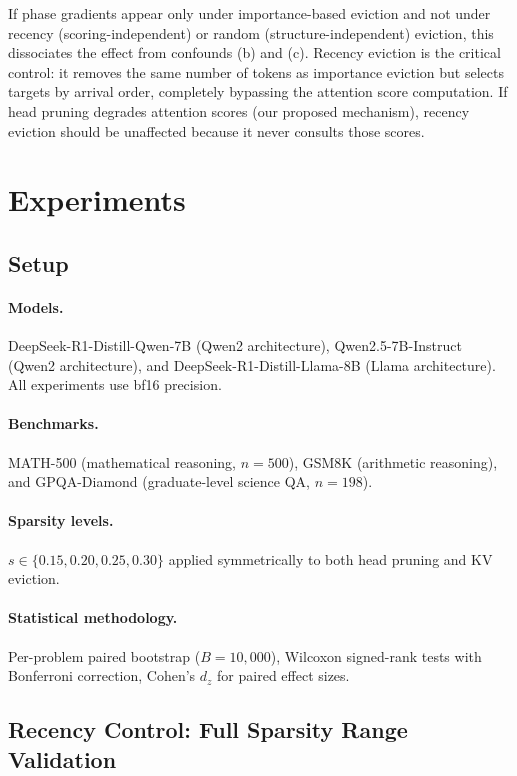 \documentclass[11pt,a4paper]{article}
\begin{document}
If phase gradients appear only under importance-based eviction and not under recency (scoring-independent) or random (structure-independent) eviction, this dissociates the effect from confounds (b) and (c). Recency eviction is the critical control: it removes the same number of tokens as importance eviction but selects targets by arrival order, completely bypassing the attention score computation. If head pruning degrades attention scores (our proposed mechanism), recency eviction should be unaffected because it never consults those scores.

\section{Experiments}

\subsection{Setup}

\paragraph{Models.} DeepSeek-R1-Distill-Qwen-7B (Qwen2 architecture), Qwen2.5-7B-Instruct (Qwen2 architecture), and DeepSeek-R1-Distill-Llama-8B (Llama architecture). All experiments use bf16 precision.

\paragraph{Benchmarks.} MATH-500 (mathematical reasoning, $n=500$), GSM8K (arithmetic reasoning), and GPQA-Diamond (graduate-level science QA, $n=198$).

\paragraph{Sparsity levels.} $s \in \{0.15, 0.20, 0.25, 0.30\}$ applied symmetrically to both head pruning and KV eviction.

\paragraph{Statistical methodology.} Per-problem paired bootstrap ($B=10{,}000$), Wilcoxon signed-rank tests with Bonferroni correction, Cohen's $d_z$ for paired effect sizes.

\subsection{Recency Control: Full Sparsity Range Validation}
\end{document}
